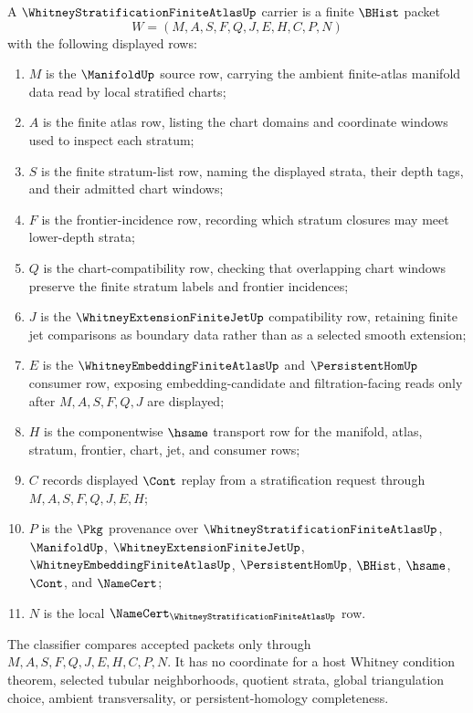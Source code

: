 \begin{definition}
\label{def:whitney-stratification-finite-atlas-carrier}
A $\WhitneyStratificationFiniteAtlasUp$ carrier is a finite $\BHist$ packet
$$
W=(M,A,S,F,Q,J,E,H,C,P,N)
$$
with the following displayed rows:
\begin{enumerate}
\item $M$ is the $\ManifoldUp$ source row, carrying the ambient finite-atlas manifold data read by local stratified charts;
\item $A$ is the finite atlas row, listing the chart domains and coordinate windows used to inspect each stratum;
\item $S$ is the finite stratum-list row, naming the displayed strata, their depth tags, and their admitted chart windows;
\item $F$ is the frontier-incidence row, recording which stratum closures may meet lower-depth strata;
\item $Q$ is the chart-compatibility row, checking that overlapping chart windows preserve the finite stratum labels and frontier incidences;
\item $J$ is the $\WhitneyExtensionFiniteJetUp$ compatibility row, retaining finite jet comparisons as boundary data rather than as a selected smooth extension;
\item $E$ is the $\WhitneyEmbeddingFiniteAtlasUp$ and $\PersistentHomUp$ consumer row, exposing embedding-candidate and filtration-facing reads only after $M,A,S,F,Q,J$ are displayed;
\item $H$ is the componentwise $\hsame$ transport row for the manifold, atlas, stratum, frontier, chart, jet, and consumer rows;
\item $C$ records displayed $\Cont$ replay from a stratification request through $M,A,S,F,Q,J,E,H$;
\item $P$ is the $\Pkg$ provenance over $\WhitneyStratificationFiniteAtlasUp$, $\ManifoldUp$, $\WhitneyExtensionFiniteJetUp$, $\WhitneyEmbeddingFiniteAtlasUp$, $\PersistentHomUp$, $\BHist$, $\hsame$, $\Cont$, and $\NameCert$;
\item $N$ is the local $\NameCert_{\WhitneyStratificationFiniteAtlasUp}$ row.
\end{enumerate}
The classifier compares accepted packets only through $M,A,S,F,Q,J,E,H,C,P,N$. It has no coordinate for a host Whitney condition theorem, selected tubular neighborhoods, quotient strata, global triangulation choice, ambient transversality, or persistent-homology completeness.
\end{definition}

